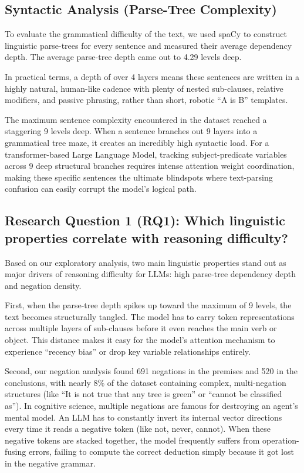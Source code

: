 \documentclass[11pt]{article}
\begin{document}
\subsection{Syntactic Analysis (Parse-Tree Complexity)}
To evaluate the grammatical difficulty of the text, we used spaCy to construct linguistic parse-trees for every sentence and measured their average dependency depth. The average parse-tree depth came out to 4.29 levels deep.

In practical terms, a depth of over 4 layers means these sentences are written in a highly natural, human-like cadence with plenty of nested sub-clauses, relative modifiers, and passive phrasing, rather than short, robotic ``A is B'' templates.

The maximum sentence complexity encountered in the dataset reached a staggering 9 levels deep. When a sentence branches out 9 layers into a grammatical tree maze, it creates an incredibly high syntactic load. For a transformer-based Large Language Model, tracking subject-predicate variables across 9 deep structural branches requires intense attention weight coordination, making these specific sentences the ultimate blindspots where text-parsing confusion can easily corrupt the model's logical path.

\subsection{Research Question 1 (RQ1): Which linguistic properties correlate with reasoning difficulty?}
Based on our exploratory analysis, two main linguistic properties stand out as major drivers of reasoning difficulty for LLMs: high parse-tree dependency depth and negation density.

First, when the parse-tree depth spikes up toward the maximum of 9 levels, the text becomes structurally tangled. The model has to carry token representations across multiple layers of sub-clauses before it even reaches the main verb or object. This distance makes it easy for the model's attention mechanism to experience ``recency bias'' or drop key variable relationships entirely.

Second, our negation analysis found 691 negations in the premises and 520 in the conclusions, with nearly 8\% of the dataset containing complex, multi-negation structures (like ``It is not true that any tree is green'' or ``cannot be classified as''). In cognitive science, multiple negations are famous for destroying an agent's mental model. An LLM has to constantly invert its internal vector directions every time it reads a negative token (like not, never, cannot). When these negative tokens are stacked together, the model frequently suffers from operation-fusing errors, failing to compute the correct deduction simply because it got lost in the negative grammar.
\end{document}
